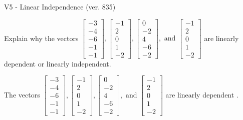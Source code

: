 \begin{exercise}
  \begin{exerciseTitle}V5 - Linear Independence (ver. 835)\end{exerciseTitle}
  \begin{exerciseStatement}
    Explain why the vectors \(\left[\begin{array}{r}
-3 \\
-4 \\
-6 \\
-1 \\
-1
\end{array}\right] , \left[\begin{array}{r}
-1 \\
2 \\
0 \\
1 \\
-2
\end{array}\right] , \left[\begin{array}{r}
0 \\
-2 \\
4 \\
-6 \\
-2
\end{array}\right] , \text{ and } \left[\begin{array}{r}
-1 \\
2 \\
0 \\
1 \\
-2
\end{array}\right]\) are linearly dependent or linearly independent.	


  \end{exerciseStatement}
  \begin{exerciseAnswer}
   The vectors \(\left[\begin{array}{r}
-3 \\
-4 \\
-6 \\
-1 \\
-1
\end{array}\right] , \left[\begin{array}{r}
-1 \\
2 \\
0 \\
1 \\
-2
\end{array}\right] , \left[\begin{array}{r}
0 \\
-2 \\
4 \\
-6 \\
-2
\end{array}\right] , \text{ and } \left[\begin{array}{r}
-1 \\
2 \\
0 \\
1 \\
-2
\end{array}\right]\) are 
  	 linearly dependent  .
  


  \end{exerciseAnswer}
\end{exercise}